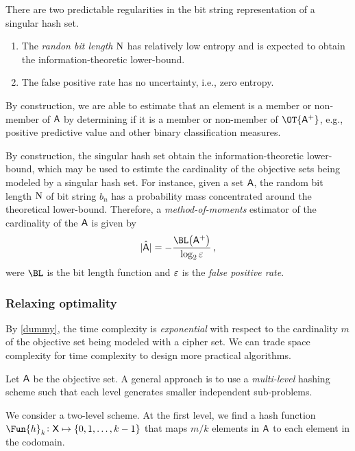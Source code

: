 \documentclass[ ../main.tex]{subfiles}
\begin{document}
There are two predictable regularities in the bit string representation of a singular hash set.
\begin{enumerate}
    \item The \emph{randon bit length} $\mathrm{N}$ has relatively low entropy and is expected to obtain the information-theoretic lower-bound.
    \item The false positive rate has no uncertainty, i.e., zero entropy.
\end{enumerate}

By construction, we are able to estimate that an element is a member or non-member of $\Set{A}$ by determining if it is a member or non-member of $\OT{\PASet{A}}$, e.g., positive predictive value and other binary classification measures.

By construction, the singular hash set obtain the information-theoretic lower-bound, which may be used to estimte the cardinality of the objective sets being modeled by a singular hash set.
For instance, given a set $\Set{A}$, the random bit length $\mathrm{N}$ of bit string $b_n$ has a probability mass concentrated around the theoretical lower-bound.
Therefore, a \emph{method-of-moments} estimator of the cardinality of the $\Set{A}$ is given by
\begin{equation}
    \hat{\Card{\Set{A}}} = -\frac{\BL\!\left(\PASet{A}\right)}{\log_2 \fprate}\,,
\end{equation}
were $\BL$ is the bit length function and $\varepsilon$ is the \emph{false positive rate}.











\subsubsection{Relaxing optimality}
By \cref{dummy}, the time complexity is \emph{exponential} with respect to the cardinality $m$ of the objective set being modeled with a cipher set.
We can trade space complexity for time complexity to design more practical algorithms.

Let $\Set{A}$ be the objective set.
A general approach is to use a \emph{multi-level} hashing scheme such that each level generates smaller independent sub-problems.

We consider a two-level scheme.
At the first level, we find a hash function $\Fun{h}_k \colon \Set{X} \mapsto \{0,1,\ldots,k-1\}$ that maps $m/k$ elements in $\Set{A}$ to each element in the codomain.
\end{document}
